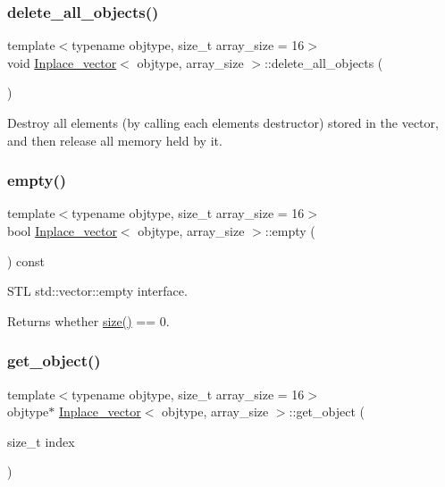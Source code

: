\subsubsection{\texorpdfstring{delete\+\_\+all\+\_\+objects()}{delete\_all\_objects()}}
{\footnotesize\ttfamily template$<$typename objtype, size\+\_\+t array\+\_\+size = 16$>$ \\
void \mbox{\hyperlink{classInplace__vector}{Inplace\+\_\+vector}}$<$ objtype, array\+\_\+size $>$\+::delete\+\_\+all\+\_\+objects (\begin{DoxyParamCaption}{ }\end{DoxyParamCaption})\hspace{0.3cm}{\ttfamily [inline]}}

Destroy all elements (by calling each element\textquotesingle{}s destructor) stored in the vector, and then release all memory held by it. \mbox{\label{classInplace__vector_a611ca3f3274eab27b302cb0e0b06e83c}} 
\subsubsection{\texorpdfstring{empty()}{empty()}}
{\footnotesize\ttfamily template$<$typename objtype, size\+\_\+t array\+\_\+size = 16$>$ \\
bool \mbox{\hyperlink{classInplace__vector}{Inplace\+\_\+vector}}$<$ objtype, array\+\_\+size $>$\+::empty (\begin{DoxyParamCaption}{ }\end{DoxyParamCaption}) const\hspace{0.3cm}{\ttfamily [inline]}}

S\+TL std\+::vector\+::empty interface. \begin{DoxyReturn}{Returns}
whether \mbox{\hyperlink{classInplace__vector_aa24e13ea5106489e799fe97512227da0}{size()}} == 0. 
\end{DoxyReturn}
\mbox{\label{classInplace__vector_a798bedb62927bc1f6817fe32ad12c990}} 
\subsubsection{\texorpdfstring{get\+\_\+object()}{get\_object()}}
{\footnotesize\ttfamily template$<$typename objtype, size\+\_\+t array\+\_\+size = 16$>$ \\
objtype$\ast$ \mbox{\hyperlink{classInplace__vector}{Inplace\+\_\+vector}}$<$ objtype, array\+\_\+size $>$\+::get\+\_\+object (\begin{DoxyParamCaption}\item[{size\+\_\+t}]{index }\end{DoxyParamCaption})\hspace{0.3cm}{\ttfamily [inline]}}

